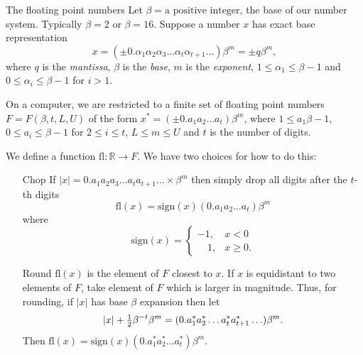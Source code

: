 \documentclass{beamer}
\begin{document}
\begin{frame}{The floating point numbers}
Let $\beta=\text{a positive integer}$, the base of our number system. Typically $\beta=2$ or $\beta=16$.
Suppose a number $x$ has exact base representation
\begin{equation*}
x = (\pm 0.\alpha_1 \alpha_2 \alpha_3 \ldots \alpha_t \alpha_{t+1} \ldots) \beta^m = \pm q \beta^m,
\end{equation*}
where $q$ is the \emph{mantissa}, $\beta$ is the \emph{base}, $m$ is the \emph{exponent}, $1 \leq \alpha_1 \leq \beta - 1$
and $0 \leq \alpha_i \leq \beta - 1$ for $i > 1$.

On a computer, we are restricted to a finite set of floating point numbers
$F = F(\beta, t, L, U)$ of the form $x^* = (\pm0.a_1 a_2 \ldots a_t) \beta^m$, where $1 \leq a_1 \beta-1$,
$0 \leq a_i \leq \beta - 1$ for $2 \leq i \leq t$, $L \leq m \leq U$ and $t$ is the number of digits.
\end{frame}


\def\fl{\text{fl}}


\begin{frame}
We define a function $\fl: \mathbb{R} \to F$. We have two choices for how to do this:
\begin{itemize}
\item[Chop] If $|x| = 0.a_1 a_2 a_3 \ldots a_t a_{t+1} \ldots \times \beta^m$ then simply drop all digits
after the $t$-th digits
\begin{equation*}
\fl(x) = \text{sign}(x) (0.a_1 a_2 \ldots a_t) \beta^m
\end{equation*}
where
\begin{equation*}
\text{sign}(x) = 
\begin{cases}
-1,& x < 0 \\
\quad 1,& x \geq 0.
\end{cases}
\end{equation*}
\item[Round] $\fl(x)$ is the element of $F$ closest to $x$. If $x$ is equidistant to two elements
of $F$, take element of $F$ which is larger in magnitude. Thus, for rounding, if $|x|$ has base $\beta$
expansion then let
\begin{equation*}
|x| + \tfrac{1}{2} \beta^{-t} \beta^m = (0.a_1^* a_2^* \ldots a_t^* a_{t+1}^*\ldots) \beta^m.
\end{equation*}
Then $\fl(x) = \text{sign}(x) (0.a_1^* a_2^* \ldots a_t^*) \beta^m$.
\end{itemize}
\end{frame}
\end{document}
